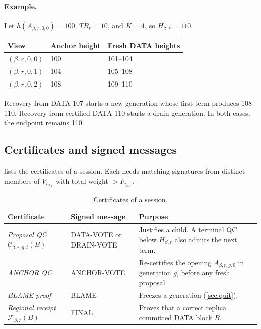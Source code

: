\documentclass[11pt,a4paper]{article}
\newcommand{\QC}{\mathcal C}
\newcommand{\FC}{\mathcal F}
\newcommand{\TB}{\mathit{TB}}
\newcommand{\defterm}[1]{\textcolor{rrBlue}{\textit{#1}}}
\begin{document}
\paragraph{Example.}
Let $h(A_{\beta,r,0,0})=100$, $\TB_r=10$, and $K=4$, so $H_{\beta,r}=110$.
\begin{center}\small
\begin{tabular}{@{}lll@{}}\toprule
View & Anchor height & Fresh DATA heights\\\midrule
$(\beta,r,0,0)$ & 100 & 101--104\\
$(\beta,r,0,1)$ & 104 & 105--108\\
$(\beta,r,0,2)$ & 108 & 109--110\\\bottomrule
\end{tabular}
\end{center}
Recovery from DATA 107 starts a new generation whose first term produces
108--110. Recovery from certified DATA 110 starts a drain generation.
In both cases, the endpoint remains 110.

\subsection{Certificates and signed messages}
\label{sec:certificates}
 lists the certificates of a session. Each needs
matching signatures from distinct members of $V_{i_{\beta,r}}$ with total weight
$>F_{i_{\beta,r}}$.

\begin{table}[htbp]\centering\small
\caption{Certificates of a session.}
\label{tab:certificates}
\begin{tabularx}{\linewidth}{@{}>{\raggedright\arraybackslash}p{.25\linewidth}>{\raggedright\arraybackslash}p{.24\linewidth}Y@{}}
\toprule
Certificate & Signed message & Purpose\\
\midrule
\defterm{Proposal QC} $\QC_{\beta,r,g,t}(B)$ & DATA-VOTE or DRAIN-VOTE & Justifies a
child. A terminal QC below $H_{\beta,r}$ also admits the next term.\\
\defterm{ANCHOR QC} & ANCHOR-VOTE & Re-certifies the opening $A_{\beta,r,g,0}$ in
generation $g$, before any fresh proposal.\\
\defterm{BLAME proof} & BLAME & Freezes a generation (\cref{sec:quit}).\\
\defterm{Regional receipt} $\FC_{\beta,r}(B)$ & FINAL & Proves that a correct replica
committed DATA block $B$.\\
\bottomrule
\end{tabularx}
\end{table}
\end{document}
